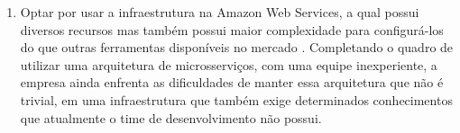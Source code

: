 \begin{enumerate}
    \item Optar por usar a infraestrutura na Amazon Web Services, a qual
    possui diversos recursos mas também possui maior complexidade para
    configurá-los do que outras ferramentas disponíveis no mercado \cite{kavya}.
    Completando o quadro de utilizar uma arquitetura de microsserviços, com
    uma equipe inexperiente, a empresa ainda enfrenta as dificuldades de manter
    essa arquitetura que não é trivial, em uma infraestrutura que também exige
    determinados conhecimentos que atualmente o time de desenvolvimento
    não possui.
  \end{enumerate}




